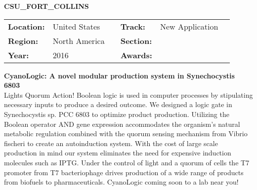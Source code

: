 \textbf{\uppercase{CSU\_Fort\_Collins}} \FloatBarrier \begin{table}[h] \begin{tabular}{lp{2.5cm}llll} \textbf{Location:} & United States & \multicolumn{1}{|l}{} & \textbf{Track:}   & New Application \\ \textbf{Region:}   & North America   & \multicolumn{1}{|l}{} & \textbf{Section:} &  \\ \textbf{Year:}     & 2016   & \multicolumn{1}{|l}{} & \textbf{Awards:}  & \end{tabular} \end{table} \FloatBarrier \noindent\textbf{CyanoLogic: A novel modular production system in Synechocystis 6803} \vspace{.2cm}\\ 
Lights Quorum Action! Boolean logic is used in computer processes by stipulating necessary inputs to produce a desired outcome. We designed a logic gate in Synechocystis sp. PCC 6803 to optimize product production. Utilizing the Boolean operator AND gene expression accommodates the organism’s natural metabolic regulation combined with the quorum sensing mechanism from Vibrio fischeri to create an autoinduction system. With the cost of large scale production in mind our system eliminates the need for expensive induction molecules such as IPTG. Under the control of light and a quorum of cells the T7 promoter from T7 bacteriophage drives production of a wide range of products from biofuels to pharmaceuticals. CyanoLogic coming soon to a lab near you!
\vspace{2cm}


